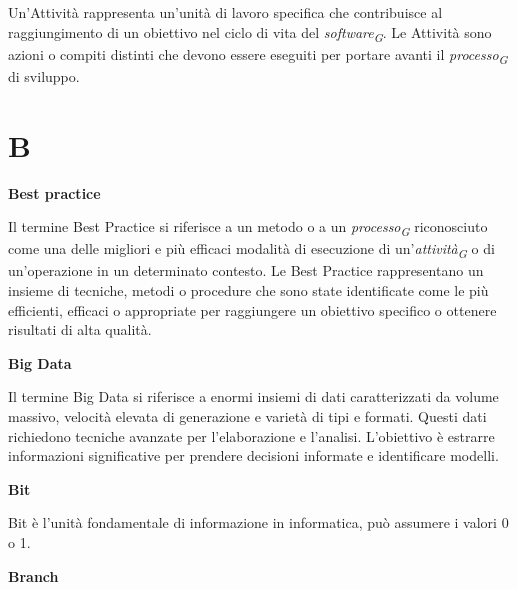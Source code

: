 \documentclass{article}
\begin{document}
Un'Attività rappresenta un'unità di lavoro specifica che contribuisce al raggiungimento di un obiettivo nel ciclo di vita del \textit{software}\textsubscript{\textit{G}}. Le Attività sono azioni o compiti distinti che devono essere eseguiti per portare avanti il \textit{processo}\textsubscript{\textit{G}} di sviluppo.

\pagebreak
\section*{B}

\vspace{0.4cm}
\textbf{Best practice}

\vspace{0.1cm}

Il termine Best Practice si riferisce a un metodo o a un \textit{processo}\textsubscript{\textit{G}} riconosciuto come una delle migliori e più efficaci modalità di esecuzione di un'\textit{attività}\textsubscript{\textit{G}} o di un'operazione in un determinato contesto. Le Best Practice rappresentano un insieme di tecniche, metodi o procedure che sono state identificate come le più efficienti, efficaci o appropriate per raggiungere un obiettivo specifico o ottenere risultati di alta qualità.

\vspace{0.4cm}

\textbf{Big Data}

\vspace{0.1cm}

Il termine Big Data si riferisce a enormi insiemi di dati caratterizzati da volume massivo, velocità elevata di generazione e varietà di tipi e formati. Questi dati richiedono tecniche avanzate per l'elaborazione e l'analisi. L'obiettivo è estrarre informazioni significative per prendere decisioni informate e identificare modelli.

\vspace{0.4cm}

\textbf{Bit}

\vspace{0.1cm}

Bit è l'unità fondamentale di informazione in informatica, può assumere i valori 0 o 1. 

\vspace{0.4cm}

\textbf{Branch}

\vspace{0.1cm}
\end{document}
